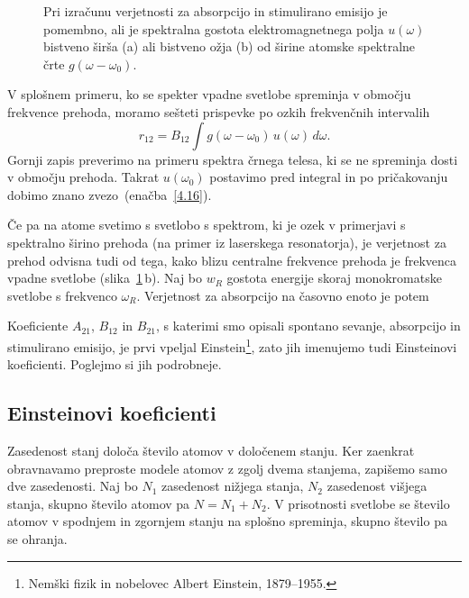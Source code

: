 \begin{figure}[h]
\centering
\def\svgwidth{140truemm} 

\caption{Pri izračunu verjetnosti za absorpcijo in stimulirano emisijo je 
pomembno, ali je spektralna gostota elektromagnetnega polja $u(\omega)$ bistveno širša
(a) ali bistveno ožja (b) od širine atomske spektralne črte $g(\omega-\omega_0)$.}
\label{fig:spektri}
\end{figure}

V splošnem primeru, ko se spekter vpadne svetlobe spreminja v območju 
frekvence prehoda, moramo sešteti prispevke po ozkih frekvenčnih intervalih
\begin{equation}
r_{12}=B_{12}\int g(\omega-\omega_0)\, u(\omega)\, d\omega.
\label{4.19}
\end{equation}
Gornji zapis preverimo na primeru spektra črnega telesa, ki se ne spreminja 
dosti v območju prehoda. Takrat $u(\omega_0)$ postavimo pred integral in po pričakovanju
dobimo znano zvezo~(enačba~\ref{4.16}). 

Če pa na atome svetimo s svetlobo s spektrom, ki je ozek v primerjavi s spektralno 
širino prehoda (na primer iz laserskega resonatorja), je verjetnost za prehod 
odvisna tudi od tega, kako blizu centralne frekvence prehoda je frekvenca vpadne 
svetlobe (slika~\ref{fig:spektri}\,b). Naj bo  $w_{R}$ gostota energije skoraj
monokromatske svetlobe s frekvenco $\omega_R$. Verjetnost za absorpcijo na časovno 
enoto je potem  

Koeficiente $A_{21}$, $B_{12}$ in $B_{21}$, s katerimi smo opisali spontano sevanje,
absorpcijo in stimulirano emisijo, je prvi vpeljal Einstein\footnote{Nemški fizik
in nobelovec Albert Einstein, 1879--1955.}, zato jih imenujemo 
tudi Einsteinovi koeficienti. Poglejmo si jih podrobneje.

\subsection*{Einsteinovi koeficienti}
\label{AB}
Zasedenost stanj določa število atomov v določenem stanju. 
Ker zaenkrat obravnavamo preproste modele atomov z zgolj 
dvema stanjema, zapišemo samo dve zasedenosti. Naj bo $N_1$ zasedenost 
nižjega stanja, $N_{2}$ zasedenost višjega stanja, skupno število atomov pa
$N=N_1+N_2$. V prisotnosti svetlobe se število atomov v spodnjem in zgornjem 
stanju na splošno spreminja, skupno število pa se ohranja.

